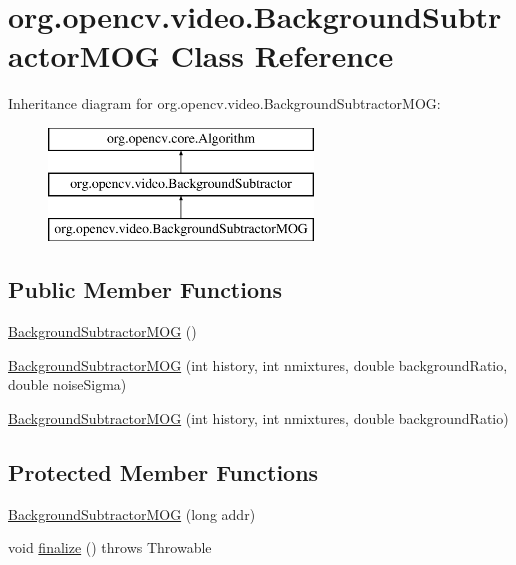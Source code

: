 \hypertarget{classorg_1_1opencv_1_1video_1_1_background_subtractor_m_o_g}{}\section{org.\+opencv.\+video.\+Background\+Subtractor\+M\+OG Class Reference}
\label{classorg_1_1opencv_1_1video_1_1_background_subtractor_m_o_g}
Inheritance diagram for org.\+opencv.\+video.\+Background\+Subtractor\+M\+OG\+:\begin{figure}[H]
\begin{center}
\leavevmode
\includegraphics[height=3.000000cm]{classorg_1_1opencv_1_1video_1_1_background_subtractor_m_o_g}
\end{center}
\end{figure}
\subsection*{Public Member Functions}
\begin{DoxyCompactItemize}
\item 
\mbox{\hyperlink{classorg_1_1opencv_1_1video_1_1_background_subtractor_m_o_g_a967a71fd61add07e4aa5959d6e5937d2}{Background\+Subtractor\+M\+OG}} ()
\item 
\mbox{\hyperlink{classorg_1_1opencv_1_1video_1_1_background_subtractor_m_o_g_a3bb67fa2656fed103b86c5bd8a5e6274}{Background\+Subtractor\+M\+OG}} (int history, int nmixtures, double background\+Ratio, double noise\+Sigma)
\item 
\mbox{\hyperlink{classorg_1_1opencv_1_1video_1_1_background_subtractor_m_o_g_a80ba98da01a2260715abf05cba9e6572}{Background\+Subtractor\+M\+OG}} (int history, int nmixtures, double background\+Ratio)
\end{DoxyCompactItemize}
\subsection*{Protected Member Functions}
\begin{DoxyCompactItemize}
\item 
\mbox{\hyperlink{classorg_1_1opencv_1_1video_1_1_background_subtractor_m_o_g_adb3b162d4343ea7625cc1c2ef18e5955}{Background\+Subtractor\+M\+OG}} (long addr)
\item 
void \mbox{\hyperlink{classorg_1_1opencv_1_1video_1_1_background_subtractor_m_o_g_a78dc82d9984004935b2c53ad459b7578}{finalize}} ()  throws Throwable 
\end{DoxyCompactItemize}
